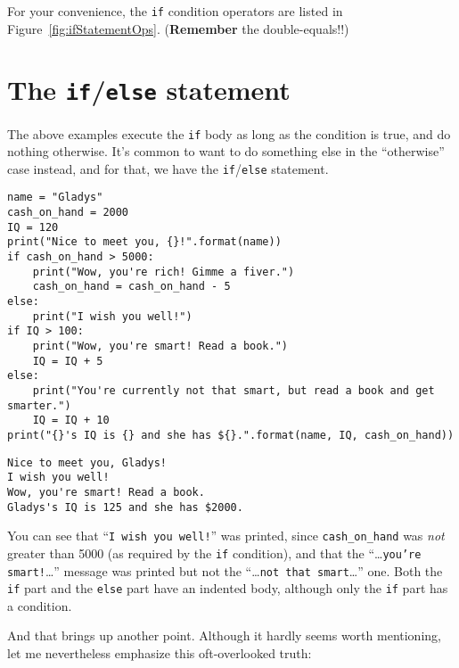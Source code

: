 
For your convenience, the \texttt{if} condition operators are listed in
Figure~\ref{fig:ifStatementOps}. (\textbf{Remember} the double-equals!!)


\section{The \texttt{if}/\texttt{else} statement}


The above examples execute the \texttt{if} body as long as the condition is
true, and do nothing otherwise. It's common to want to do something else in the
``otherwise'' case instead, and for that, we have the \texttt{if}/\texttt{else}
statement.

\begin{Verbatim}[fontsize=\footnotesize,samepage=true,frame=single,framesep=3mm]
name = "Gladys"
cash_on_hand = 2000
IQ = 120
print("Nice to meet you, {}!".format(name))
if cash_on_hand > 5000:
    print("Wow, you're rich! Gimme a fiver.")
    cash_on_hand = cash_on_hand - 5
else:
    print("I wish you well!")
if IQ > 100:
    print("Wow, you're smart! Read a book.")
    IQ = IQ + 5
else:
    print("You're currently not that smart, but read a book and get smarter.")
    IQ = IQ + 10
print("{}'s IQ is {} and she has ${}.".format(name, IQ, cash_on_hand))
\end{Verbatim}
\vspace{-.2in}

\begin{Verbatim}[fontsize=\small,samepage=true,frame=leftline,framesep=5mm,framerule=1mm]
Nice to meet you, Gladys!
I wish you well!
Wow, you're smart! Read a book.
Gladys's IQ is 125 and she has $2000.
\end{Verbatim}

You can see that ``\texttt{I wish you well!}'' was printed, since
\texttt{cash\_on\_hand} was \textit{not} greater than 5000 (as required by the
\texttt{if} condition), and that the ``\dots\texttt{you're smart!}\dots''
message was printed but not the ``\dots\texttt{not that smart}\dots'' one.
Both the \texttt{if} part and the \texttt{else} part have an indented body,
although only the \texttt{if} part has a condition.

And that brings up another point. Although it hardly seems worth mentioning,
let me nevertheless emphasize this oft-overlooked truth:

